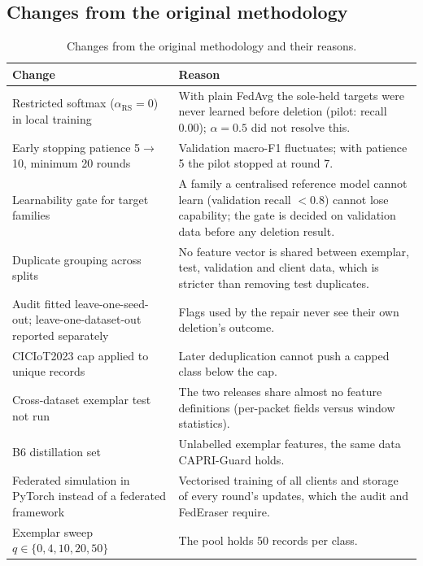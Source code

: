 \documentclass[pdflatex,sn-mathphys-num,iicol]{sn-jnl}
\begin{document}
\clearpage
\onecolumn
\begin{appendices}

\FloatBarrier
\section{Changes from the original methodology}\label{app:changes}

\begin{table}[!htbp]
\caption{Changes from the original methodology and their reasons.}\label{tab:changes}
\footnotesize
\begin{tabular*}{\textwidth}{@{\extracolsep\fill}>{\raggedright\arraybackslash}p{4.6cm}>{\raggedright\arraybackslash}p{10.8cm}@{}}
\toprule
Change & Reason \\
\midrule
Restricted softmax ($\alpha_{\mathrm{RS}}=0$) in local training & With plain FedAvg the sole-held targets were never learned before deletion (pilot: recall 0.00); $\alpha=0.5$ did not resolve this. \\
Early stopping patience 5$\rightarrow$10, minimum 20 rounds & Validation macro-F1 fluctuates; with patience 5 the pilot stopped at round 7. \\
Learnability gate for target families & A family a centralised reference model cannot learn (validation recall $<0.8$) cannot lose capability; the gate is decided on validation data before any deletion result. \\
Duplicate grouping across splits & No feature vector is shared between exemplar, test, validation and client data, which is stricter than removing test duplicates. \\
Audit fitted leave-one-seed-out; leave-one-dataset-out reported separately & Flags used by the repair never see their own deletion's outcome. \\
CICIoT2023 cap applied to unique records & Later deduplication cannot push a capped class below the cap. \\
Cross-dataset exemplar test not run & The two releases share almost no feature definitions (per-packet fields versus window statistics). \\
B6 distillation set & Unlabelled exemplar features, the same data CAPRI-Guard holds. \\
Federated simulation in PyTorch instead of a federated framework & Vectorised training of all clients and storage of every round's updates, which the audit and FedEraser require. \\
Exemplar sweep $q\in\{0,4,10,20,50\}$ & The pool holds 50 records per class. \\

\end{tabular*}
\end{table}
\end{appendices}
\end{document}
